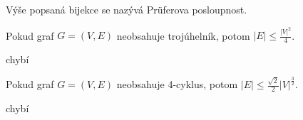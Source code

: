\begin{t_remark}
  Výše popsaná bijekce se nazývá Prüferova posloupnost.
\end{t_remark}

\begin{t_theorem}
  Pokud graf $G=(V,E)$ neobsahuje trojúhelník, potom $|E|\leq \frac{|V|^2}{4}$.
\end{t_theorem}

\begin{t_proof}
  chybí %
\end{t_proof}

\begin{t_theorem}
  Pokud graf $G=(V,E)$ neobsahuje 4-cyklus, potom $|E|\leq \frac{\sqrt{2}}{2}|V|^\frac{3}{2}$.
\end{t_theorem}

\begin{t_proof}
  chybí %
\end{t_proof}
